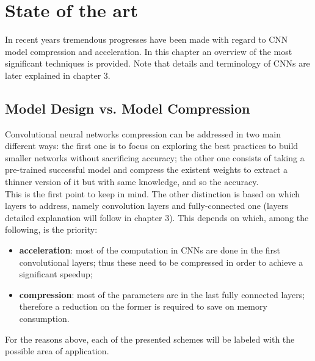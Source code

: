 


\chapter{State of the art} %
\label{Chapter2}
\def \teoria {Figures/teoria}
\def \path	 {Figures/C2}

In recent years tremendous progresses have been made with regard to CNN model compression and acceleration. In this chapter an overview of the most significant techniques is provided. Note that details and terminology of CNNs are later explained in chapter 3. 

\section{Model Design vs. Model Compression}
Convolutional neural networks compression can be addressed in two main different ways: the first one is to focus on exploring the best practices to build smaller networks without sacrificing accuracy; the other one consists of taking a pre-trained successful model and compress the existent weights to extract a thinner version of it but with same knowledge, and so the accuracy. \\
This is the first point to keep in mind. 
\newline 
The other distinction is based on which layers to address, namely convolution layers and fully-connected one (layers detailed explanation will follow in chapter 3). This depends on which, among the following, is the priority: 
    \begin{itemize}
        \item  \textbf{acceleration}: most of the computation in CNNs are done in the first convolutional layers; thus these need to be compressed in order to achieve a significant speedup; 
        
        \item \textbf{compression}: most of the parameters are in the last fully connected layers; therefore a reduction on the former is required to save on memory consumption.
    \end{itemize}
    
For the reasons above, each of the presented schemes will be labeled with the possible area of application. 

